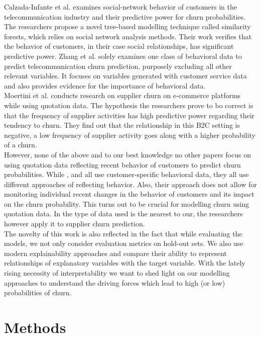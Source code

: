 \documentclass[12pt,titlepage]{article}
\begin{document}
Calzada-Infante et al. \cite{calzada} examines social-network behavior of customers in the telecommunication industry and their predictive power for churn probabilities. The researchers propose a novel tree-based modelling technique called similarity forests, which relies on social network analysis methods. Their work verifies that the behavior of customers, in their case social relationships, has significant predictive power. Zhang et al. \cite{zhang} solely examines one class of behavioral data to predict telecommunication churn prediction, purposely excluding all other relevant variables. It focuses on variables generated with customer service data and also provides evidence for the importance of behavioral data. \\
Moertini et al. \cite{moertini} conducts research on supplier churn on e-commerce platforms while using quotation data. The hypothesis the researchers prove to bo correct is that the frequency of supplier activities has high predictive power regarding their tendency to churn. They find out that the relationship in this B2C setting is negative, a low frequency of supplier activity goes along with a higher probability of a churn. \\
However, none of the above and to our best knowledge no other papers focus on using quotation data reflecting recent behavior of customers to predict churn probabilities. While \cite{khodabandehlou}, \cite{calzada} and \cite{zhang} all use customer-specific behavioral data, they all use different approaches of reflecting behavior. Also, their approach does not allow for monitoring individual recent changes in the behavior of customers and its impact on the churn probability. This turns out to be crucial for modelling churn using quotation data. In \cite{moertini} the type of data used is the nearest to our, the researchers however apply it to supplier churn prediction. \\
The novelty of this work is also reflected in the fact that while evaluating the models, we not only consider evaluation metrics on hold-out sets. We also use modern explainability approaches and compare their ability to represent relationships of explanatory variables with the target variable. With the lately rising necessity of interpretability we want to shed light on our modelling approaches to understand the driving forces which lead to high (or low) probabilities of churn. \\


\section{Methods} \par
\end{document}
